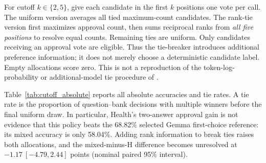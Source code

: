 For cutoff $k\in\{2,5\}$, give each candidate in the first $k$ positions one vote per call. The uniform version averages all tied maximum-count candidates. The rank-tie version first maximizes approval count, then sums reciprocal ranks from \emph{all five positions} to resolve equal counts. Remaining ties are uniform. Only candidates receiving an approval vote are eligible. Thus the tie-breaker introduces additional preference information; it does not merely choose a deterministic candidate label. Empty allocations score zero. This is not a reproduction of the token-log-probability or additional-model tie procedure of \citet{wang2025ranked}.

Table~\ref{tab:cutoff_absolute} reports all absolute accuracies and tie rates. A tie rate is the proportion of question--bank decisions with multiple winners before the final uniform draw. In particular, Health's two-answer approval gain is not evidence that this policy beats the 68.82\% selected Gemma first-choice reference: its mixed accuracy is only 58.04\%. Adding rank information to break ties raises both allocations, and the mixed-minus-H difference becomes unresolved at $-1.17\ [-4.79,2.44]$ points (nominal paired 95\% interval).

